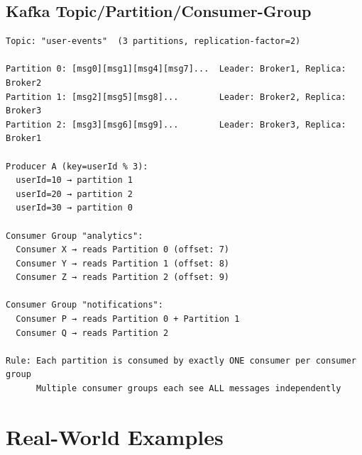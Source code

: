 \documentclass[11pt]{article}
\begin{document}
\subsection{Kafka Topic/Partition/Consumer-Group}\label{kafka-topicpartitionconsumer-group}

\setcodelang{}

\begin{verbatim}
Topic: "user-events"  (3 partitions, replication-factor=2)

Partition 0: [msg0][msg1][msg4][msg7]...  Leader: Broker1, Replica: Broker2
Partition 1: [msg2][msg5][msg8]...        Leader: Broker2, Replica: Broker3
Partition 2: [msg3][msg6][msg9]...        Leader: Broker3, Replica: Broker1

Producer A (key=userId % 3):
  userId=10 → partition 1
  userId=20 → partition 2
  userId=30 → partition 0

Consumer Group "analytics":
  Consumer X → reads Partition 0 (offset: 7)
  Consumer Y → reads Partition 1 (offset: 8)
  Consumer Z → reads Partition 2 (offset: 9)

Consumer Group "notifications":
  Consumer P → reads Partition 0 + Partition 1
  Consumer Q → reads Partition 2

Rule: Each partition is consumed by exactly ONE consumer per consumer group
      Multiple consumer groups each see ALL messages independently
\end{verbatim}

\section{Real-World Examples}\label{real-world-examples}
\end{document}
